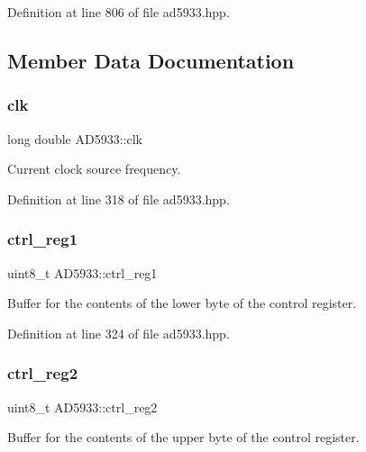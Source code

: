Definition at line 806 of file ad5933.\+hpp.



\subsection{Member Data Documentation}
\mbox{\label{struct_a_d5933_a552da2a3ded06d4b125857bfd98c4af3}} 
\subsubsection{\texorpdfstring{clk}{clk}}
{\footnotesize\ttfamily long double A\+D5933\+::clk}



Current clock source frequency. 



Definition at line 318 of file ad5933.\+hpp.

\mbox{\label{struct_a_d5933_ad9e85de1ff2845c130ced2d96767ec8d}} 
\subsubsection{\texorpdfstring{ctrl\+\_\+reg1}{ctrl\_reg1}}
{\footnotesize\ttfamily uint8\+\_\+t A\+D5933\+::ctrl\+\_\+reg1}



Buffer for the contents of the lower byte of the control register. 



Definition at line 324 of file ad5933.\+hpp.

\mbox{\label{struct_a_d5933_ad69ea003f71612df5cdcaddd3cfb32dd}} 
\subsubsection{\texorpdfstring{ctrl\+\_\+reg2}{ctrl\_reg2}}
{\footnotesize\ttfamily uint8\+\_\+t A\+D5933\+::ctrl\+\_\+reg2}



Buffer for the contents of the upper byte of the control register. 



